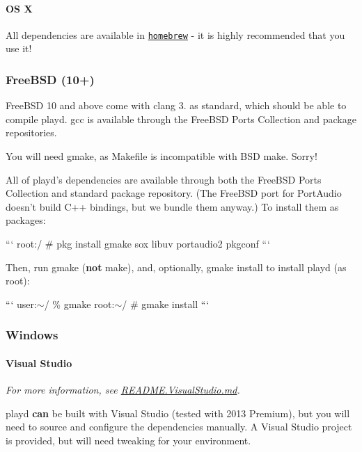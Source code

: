 \paragraph*{O\+S X}

All dependencies are available in \href{http://brew.sh}{\tt homebrew} -\/ it is highly recommended that you use it!

\subsubsection*{Free\+B\+S\+D (10+)}

Free\+B\+S\+D 10 and above come with {\ttfamily clang} 3. as standard, which should be able to compile {\ttfamily playd}. {\ttfamily gcc} is available through the Free\+B\+S\+D Ports Collection and package repositories.

You will need {\ttfamily gmake}, as {\ttfamily Makefile} is incompatible with B\+S\+D make. Sorry!

All of {\ttfamily playd}'s dependencies are available through both the Free\+B\+S\+D Ports Collection and standard package repository. (The Free\+B\+S\+D port for Port\+Audio doesn't build C++ bindings, but we bundle them anyway.) To install them as packages\+:

``` root\+:/ \# pkg install gmake sox libuv portaudio2 pkgconf ```

Then, run {\ttfamily gmake} ({\bfseries not} {\ttfamily make}), and, optionally, {\ttfamily gmake install} to install {\ttfamily playd} (as root)\+:

``` user\+:$\sim$/ \% gmake root\+:$\sim$/ \# gmake install ```

\subsubsection*{Windows}

\paragraph*{Visual Studio}

{\itshape For more information, see {\ttfamily \hyperlink{README_8VisualStudio_8md_source}{R\+E\+A\+D\+M\+E.\+Visual\+Studio.\+md}}.}

playd {\bfseries can} be built with Visual Studio (tested with 2013 Premium), but you will need to source and configure the dependencies manually. A Visual Studio project is provided, but will need tweaking for your environment.

